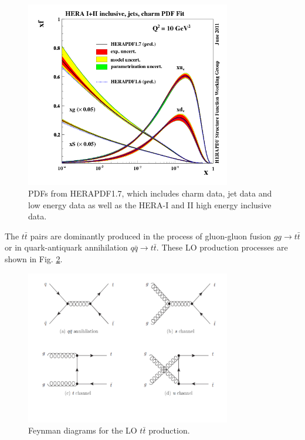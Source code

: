\begin{figure}[t]
  \centering
  \includegraphics[width=0.8\textwidth]{01_Theory_SM/plots/herapdf17.png}
  \caption{PDFs from HERAPDF1.7, which includes charm data, jet data and low energy data as well as the HERA-I and II high energy inclusive data.}
  \label{fig:HERA_PDF}
\end{figure}

The $t\bar{t}$ pairs are dominantly produced in the process of gluon-gluon fusion $gg \rightarrow t\bar{t}$ or in quark-antiquark annihilation $q\bar{q} \rightarrow t\bar{t}$.
These LO production processes are shown in Fig. \ref{fig:LO_tt_prod}.

\begin{figure}[h]
  \centering
  \includegraphics[width=0.8\textwidth]{01_Theory_SM/plots/LO_tt_production.pdf}
  \caption{Feynman diagrams for the LO $t\bar{t}$ production.}
  \label{fig:LO_tt_prod}
\end{figure}

